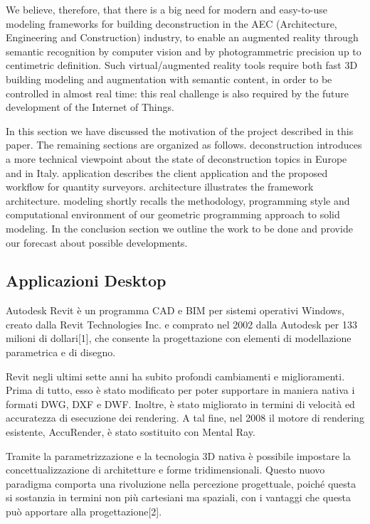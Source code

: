 We believe, therefore, that there is a big need for modern and easy-to-use modeling frameworks for building deconstruction in the AEC (Architecture, Engineering and Construction) industry, to enable an augmented reality through semantic recognition by computer vision and by photogrammetric precision up to centimetric definition. Such virtual/augmented reality tools require both fast 3D building modeling and augmentation with semantic content, in order to be controlled in almost real time: this real challenge is also required by the future development of the Internet of Things.

In this section we have discussed the motivation of the project described in this paper. The remaining sections are organized as follows.
deconstruction introduces a more technical viewpoint about the state of deconstruction topics in Europe and in Italy.
application describes the client application and the proposed workflow for quantity surveyors.
architecture illustrates the framework architecture.
modeling shortly recalls the methodology, programming style and computational environment of our geometric programming approach to solid modeling.
In the conclusion section we outline the work to be done and provide our forecast about possible developments.
\newpage
\subsection{Applicazioni Desktop}

Autodesk Revit è un programma CAD e BIM per sistemi operativi Windows, creato dalla Revit Technologies Inc. e comprato nel 2002 dalla Autodesk per 133 milioni di dollari[1], che consente la progettazione con elementi di modellazione parametrica e di disegno.

Revit negli ultimi sette anni ha subito profondi cambiamenti e miglioramenti. Prima di tutto, esso è stato modificato per poter supportare in maniera nativa i formati DWG, DXF e DWF. Inoltre, è stato migliorato in termini di velocità ed accuratezza di esecuzione dei rendering. A tal fine, nel 2008 il motore di rendering esistente, AccuRender, è stato sostituito con Mental Ray.

Tramite la parametrizzazione e la tecnologia 3D nativa è possibile impostare la concettualizzazione di architetture e forme tridimensionali. Questo nuovo paradigma comporta una rivoluzione nella percezione progettuale, poiché questa si sostanzia in termini non più cartesiani ma spaziali, con i vantaggi che questa può apportare alla progettazione[2].

